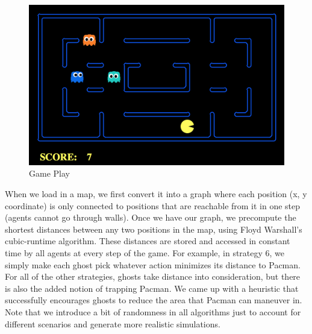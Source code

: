 \documentclass[11pt]{article}
\begin{document}
\begin{multicols}{2}
\begin{figure}[H]
	\includegraphics[width=\columnwidth]{examplemap.png}
	\caption{Game Play}
	\label{fig:gameplay}
\end{figure}
	

When we load in a map, we first convert it into a graph where each position (x, y coordinate) is only connected to positions that are reachable from it in one step (agents cannot go through walls). Once we have our graph, we precompute the shortest distances between any two positions in the map, using Floyd Warshall's cubic-runtime algorithm. These distances are stored and accessed in constant time by all agents at every step of the game. For example, in strategy 6, we simply make each ghost pick whatever action minimizes its distance to Pacman. For all of the other strategies, ghosts take distance into consideration, but there is also the added notion of trapping Pacman. We came up with a heuristic that successfully encourages ghosts to reduce the area that Pacman can maneuver in. Note that we introduce a bit of randomness in all algorithms just to account for different scenarios and generate more realistic simulations.\\

\end{multicols}
\end{document}
